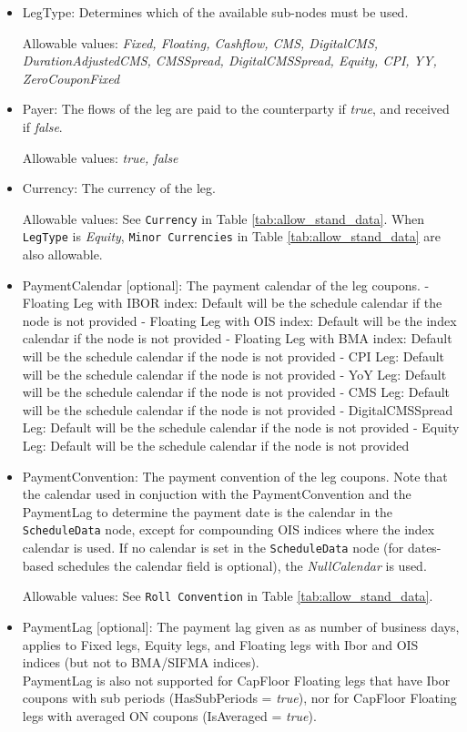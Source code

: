 \begin{itemize}
\item LegType:  Determines which of the available sub-nodes must be
  used. 

Allowable values:  \emph{Fixed, Floating, Cashflow, CMS, DigitalCMS, DurationAdjustedCMS, CMSSpread, DigitalCMSSpread, Equity, CPI, YY, ZeroCouponFixed}

\item Payer:  The flows of the leg are paid to the counterparty if
  \emph{true}, and received if \emph{false}.  

Allowable values:  \emph{true, false} 

\item Currency: The currency of the leg. 

Allowable values:  See \lstinline!Currency! in Table \ref{tab:allow_stand_data}. When \lstinline!LegType! is \emph{Equity}, \lstinline!Minor Currencies! in Table \ref{tab:allow_stand_data} are also allowable.

\item PaymentCalendar [optional]: The payment calendar of the leg coupons. 
		- Floating Leg with IBOR index: Default will be the schedule calendar if the node is not provided
		- Floating Leg with OIS index: Default will be the index calendar if the node is not provided
		- Floating Leg with BMA index: Default will be the schedule calendar if the node is not provided
		- CPI Leg: Default will be the schedule calendar if the node is not provided
		- YoY Leg: Default will be the schedule calendar if the node is not provided
		- CMS Leg: Default will be the schedule calendar if the node is not provided
		- DigitalCMSSpread Leg: Default will be the schedule calendar if the node is not provided
		- Equity Leg: Default will be the schedule calendar if the node is not provided
	
\item PaymentConvention: The payment convention of the leg coupons. Note that the calendar used in conjuction with the PaymentConvention and the PaymentLag to determine the payment date is the calendar in the \lstinline!ScheduleData! node, except for compounding OIS indices where the index calendar is used. If no calendar is set in the \lstinline!ScheduleData! node (for dates-based schedules the calendar field is optional), the \emph{NullCalendar} is used. 

Allowable values: See \lstinline!Roll Convention! in Table \ref{tab:allow_stand_data}.

\item PaymentLag [optional]: The payment lag given as as number of business days, applies to Fixed legs, Equity legs, and Floating legs with Ibor and OIS indices (but not to BMA/SIFMA indices). \\
PaymentLag is also not supported for CapFloor Floating legs that have Ibor coupons with sub periods (HasSubPeriods = \emph{true}), nor for CapFloor Floating legs with averaged ON coupons (IsAveraged = \emph{true}).


\end{itemize}
